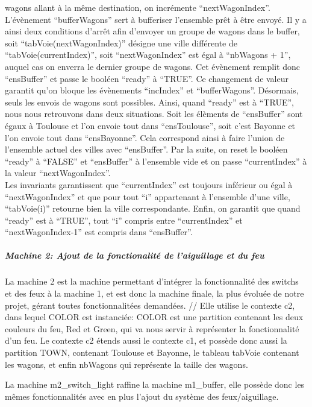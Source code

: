 wagons allant à la même destination, on incrémente ``nextWagonIndex''.
L'évènement ``bufferWagons'' sert à bufferiser l'ensemble prêt à être envoyé. Il y a
ainsi deux conditions d'arrêt afin d'envoyer un groupe de wagons dans le buffer,
soit ``tabVoie(nextWagonIndex)'' désigne une ville différente de
``tabVoie(currentIndex)'', soit ``nextWagonIndex'' est égal à ``nbWagons + 1'', auquel
cas on enverra le dernier groupe de wagons. Cet évènement remplit donc ``ensBuffer''
et passe le booléen ``ready'' à ``TRUE''. Ce changement de valeur garantit qu'on
bloque les évènements ``incIndex'' et ``bufferWagons''. Désormais, seuls les envois
de wagons sont possibles.
Ainsi, quand ``ready'' est à ``TRUE'', nous nous retrouvons dans deux situations.
Soit les élèments de ``ensBuffer'' sont égaux à Toulouse et l'on envoie tout dans
``ensToulouse'', soit c'est Bayonne et l'on envoie tout dans ``ensBayonne''. Cela
correspond ainsi à faire l'union de l'ensemble actuel des villes avec ``ensBuffer''.
Par la suite, on reset le booléen ``ready'' à ``FALSE'' et ``ensBuffer'' à l'ensemble
vide et on passe ``currentIndex'' à la valeur ``nextWagonIndex''.
\\
Les invariants garantissent que ``currentIndex'' est toujours inférieur ou égal à
``nextWagonIndex'' et que pour tout ``i'' appartenant à l'ensemble d'une ville,
``tabVoie(i)'' retourne bien la ville correspondante. Enfin, on garantit que quand
``ready'' est à ``TRUE'', tout ``i'' compris entre ``currentIndex'' et ``nextWagonIndex-1'' est compris dans ``ensBuffer''.


\subparagraph{Machine 2: Ajout de la fonctionalité de l'aiguillage et du feu}



La machine 2 est la machine permettant d'intégrer la fonctionnalité des switchs et des feux à la machine 1, et est donc la machine finale, la plus évoluée de notre projet, gérant toutes fonctionnalitées demandées.
//
Elle utilise le contexte c2,  dans lequel COLOR est instanciée: COLOR est une  partition contenant les deux couleurs du feu, Red et Green, qui va nous servir à représenter la fonctionnalité d'un feu.
Le contexte c2 étends aussi le contexte c1, et possède donc aussi la partition TOWN, contenant Toulouse et Bayonne, le tableau tabVoie contenant les wagons, et enfin nbWagons qui représente la taille des wagons.

La machine m2_switch_light raffine la machine m1_buffer, elle possède donc les mêmes fonctionnalités avec en plus l'ajout du système des feux/aiguillage.

